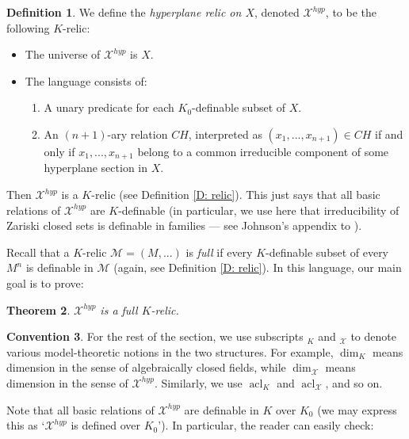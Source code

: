 \documentclass{amsart}
\newtheorem{theorem}{Theorem}[section]
\theoremstyle{definition}
\newtheorem{definition}[theorem]{Definition}
\newtheorem{convention}[theorem]{Convention}
\newcommand{\acl}{\operatorname{acl}}
\begin{document}
\begin{definition}\label{D: hyp relic}
    We define the \textit{hyperplane relic on $X$}, denoted $\mathcal X^{hyp}$, to be the following $K$-relic:

    \begin{itemize}
        \item The universe of $\mathcal X^{hyp}$ is $X$.
        \item The language consists of:
        \begin{enumerate}
            \item A unary predicate for each $K_0$-definable subset of $X$.
            \item An $(n+1)$-ary relation $CH$, interpreted as $(x_1,...,x_{n+1})\in CH$ if and only if $x_1,...,x_{n+1}$ belong to a common irreducible component of some hyperplane section in $X$.
        \end{enumerate}
    \end{itemize}
\end{definition}

 Then $\mathcal X^{hyp}$ is a $K$-relic (see Definition \ref{D: relic}). This just says that all basic relations of $\mathcal X^{hyp}$ are $K$-definable (in particular, we use here that irreducibility of Zariski closed sets is definable in families --- see Johnson's appendix to \cite{JohIrr}). 

 Recall that a $K$-relic $\mathcal M=(M,...)$ is \textit{full} if every $K$-definable subset of every $M^n$ is definable in $\mathcal M$ (again, see Definition \ref{D: relic}). In this language, our main goal is to prove:

\begin{theorem}\label{T: full relic}
    $\mathcal X^{hyp}$ is a full $K$-relic.
\end{theorem}

\begin{convention}\label{Con: notation} For the rest of the section, we use subscripts $_K$ and $_{\mathcal X}$ to denote various model-theoretic notions in the two structures. For example, $\dim_{K}$ means dimension in the sense of algebraically closed fields, while $\dim_{\mathcal X}$ means dimension in the sense of $\mathcal X^{hyp}$. Similarly, we use $\acl_{K}$ and $\acl_{\mathcal X}$, and so on.
\end{convention}

Note that all basic relations of $\mathcal X^{hyp}$ are definable in $K$ over $K_0$ (we may express this as `$\mathcal X^{hyp}$ is defined over $K_0$'). In particular, the reader can easily check:
\end{document}
